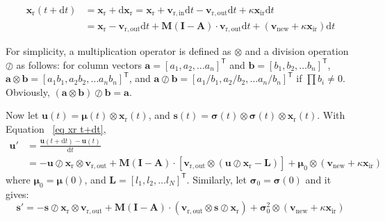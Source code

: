\documentclass[review,11pt,nonatbib]{elsarticle}
\begin{document}
\begin{equation}\label{eq xr t+dt}
\begin{aligned}
\mathbf{x}_{\mathrm{r}}(t+\mathrm{d}t)
& = \mathbf{x}_{\mathrm{r}} + \mathrm{d} \mathbf{x}_{\mathrm{r}} = \mathbf{x}_{\mathrm{r}} + \mathbf{v}_{\mathrm{r,in}}\mathrm{d}t - \mathbf{v}_{\mathrm{r,out}}\mathrm{d}t + \kappa \mathbf{x}_{\mathrm{ir}}\mathrm{d}t  \\
&=  \mathbf{x}_{\mathrm{r}} - \mathbf{v}_{\mathrm{r,out}}\mathrm{d}t + \mathbf{M}(\mathbf{I}-\mathbf{A})\cdot \mathbf{v}_{\mathrm{r,out}}\mathrm{d}t + (\mathbf{v}_{\mathrm{new}} +\kappa \mathbf{x}_{\mathrm{ir}})\mathrm{d}t
\end{aligned}
\end{equation}
\par For simplicity, a multiplication operator is defined as $\otimes$ and a division operation $\oslash$ as follows: for column vectors $\mathbf{a}=[a_1,a_2,\ldots a_n]^{\mathsf{T}}$ and $\mathbf{b}=[b_1,b_2,\ldots b_n]^{\mathsf{T}}$, $\mathbf{a}\otimes\mathbf{b}=[a_1b_1,a_2b_2,\ldots a_nb_n]^{\mathsf{T}}$, and $\mathbf{a}\oslash\mathbf{b}=[a_1/b_1,a_2/b_2,\ldots a_n/b_n]^{\mathsf{T}}$ if $\prod b_i\neq 0$. Obviously, $(\mathbf{a}\otimes\mathbf{b})\oslash \mathbf{b}=\mathbf{a}$.
\par Now let $\mathbf{u}(t)={\bm{\mu}}(t)\otimes \mathbf{x}_{\mathrm{r}}(t)$, and $\mathbf{s}(t)={\bm{\sigma}}(t)\otimes {\bm{\sigma}}(t)\otimes \mathbf{x}_{\mathrm{r}}(t)$. With Equation ~\eqref{eq xr t+dt},
\begin{equation}\label{eq u diff}
\begin{aligned}
\mathbf{u}' &= \frac{\mathbf{u}(t+\mathrm{d}t)-\mathbf{u}(t)}{\mathrm{d}t} \\
&=  - \mathbf{u}\oslash \mathbf{x}_{\mathrm{r}} \otimes\mathbf{v}_{\mathrm{r,out}}+ \mathbf{M}(\mathbf{I}-\mathbf{A})\cdot \left[\mathbf{v}_{\mathrm{r,out}}\otimes(\mathbf{u}\oslash \mathbf{x}_{\mathrm{r}}-\mathbf{L})\right] + {\bm{\mu}_0}\otimes(\mathbf{v}_{\mathrm{new}} +\kappa \mathbf{x}_{\mathrm{ir}})
\end{aligned}
\end{equation}
where  ${\bm{\mu}_0}= {\bm{\mu}}(0)$, and $\mathbf{L}=[l_1,l_2,\ldots l_N]^{\textsf{T}}$. Similarly, let ${\bm{\sigma}_0}= {\bm{\sigma}}(0)$ and it gives:
\begin{equation}\label{eq s diff}
\mathbf{s}' = - \mathbf{s}\oslash \mathbf{x}_{\mathrm{r}} \otimes\mathbf{v}_{\mathrm{r,out}}+ \mathbf{M}(\mathbf{I}-\mathbf{A})\cdot \left(\mathbf{v}_{\mathrm{r,out}}\otimes\mathbf{s}\oslash \mathbf{x}_{\mathrm{r}}\right) + {\bm{\sigma}_0^2}\otimes(\mathbf{v}_{\mathrm{new}} +\kappa \mathbf{x}_{\mathrm{ir}})
\end{equation}
\end{document}
